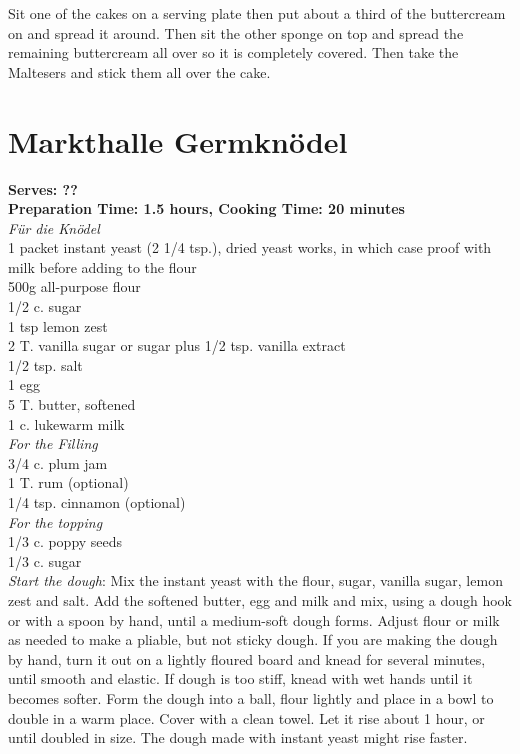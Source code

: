 \documentclass[18pt, oneside]{book}
\begin{document}
Sit one of the cakes on a serving plate then put about a third of the buttercream on and spread it around. Then sit the other sponge on top and spread the remaining buttercream all over so it is completely covered. Then take the Maltesers and stick them all over the cake. \\

\section{Markthalle Germkn\"{o}del}
\textbf{Serves: ??} \\
\textbf{Preparation Time: 1.5 hours, Cooking Time: 20 minutes} \\

\textit{F\"{u}r die Kn\"{o}del} \\
1 packet instant yeast (2 1/4 tsp.), dried yeast works, in which case proof with milk before adding to the flour \\
500g all-purpose flour \\
1/2 c. sugar \\
1 tsp lemon zest \\
2 T. vanilla sugar or sugar plus 1/2 tsp. vanilla extract \\
1/2 tsp. salt \\
1 egg \\
5 T. butter, softened \\
1 c. lukewarm milk \\

\textit{For the Filling} \\
3/4 c. plum jam \\
1 T. rum (optional) \\
1/4 tsp. cinnamon (optional) \\

\textit{For the topping} \\
1/3 c. poppy seeds \\
1/3 c. sugar \\

\textit{Start the dough}: Mix the instant yeast with the flour, sugar, vanilla sugar, lemon zest and salt. Add the softened butter, egg and milk and mix, using a dough hook or with a spoon by hand, until a medium-soft dough forms. Adjust flour or milk as needed to make a pliable, but not sticky dough. If you are making the dough by hand, turn it out on a lightly floured board and knead for several minutes, until smooth and elastic. If dough is too stiff, knead with wet hands until it becomes softer. Form the dough into a ball, flour lightly and place in a bowl to double in a warm place. Cover with a clean towel. Let it rise about 1 hour, or until doubled in size. The dough made with instant yeast might rise faster. \\
\end{document}
